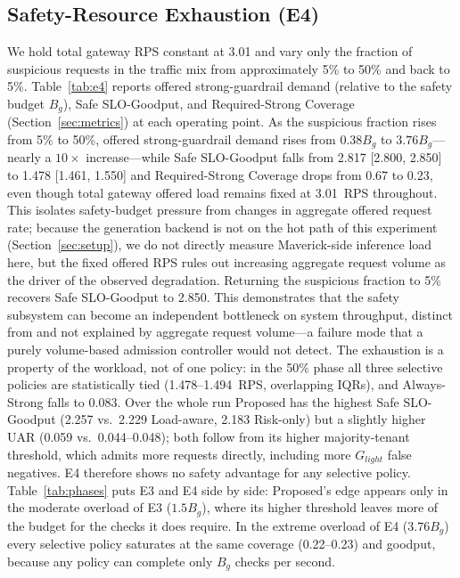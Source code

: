 \documentclass[conference]{IEEEtran}
\newcommand{\Glight}{G_{\mathit{light}}}
\newcommand{\Bg}{B_g}
\begin{document}
\subsection{Safety-Resource Exhaustion (E4)}

We hold total gateway RPS constant at 3.01 and vary only the fraction of suspicious requests in the traffic mix from approximately 5\% to 50\% and back to 5\%. Table~\ref{tab:e4} reports offered strong-guardrail demand (relative to the safety budget $\Bg$), Safe SLO-Goodput, and Required-Strong Coverage (Section~\ref{sec:metrics}) at each operating point. As the suspicious fraction rises from 5\% to 50\%, offered strong-guardrail demand rises from $0.38\Bg$ to $3.76\Bg$---nearly a $10\times$ increase---while Safe SLO-Goodput falls from 2.817 [2.800, 2.850] to 1.478 [1.461, 1.550] and Required-Strong Coverage drops from 0.67 to 0.23, even though total gateway offered load remains fixed at 3.01~RPS throughout. This isolates safety-budget pressure from changes in aggregate offered request rate; because the generation backend is not on the hot path of this experiment (Section~\ref{sec:setup}), we do not directly measure Maverick-side inference load here, but the fixed offered RPS rules out increasing aggregate request volume as the driver of the observed degradation. Returning the suspicious fraction to 5\% recovers Safe SLO-Goodput to 2.850. This demonstrates that the safety subsystem can become an independent bottleneck on system throughput, distinct from and not explained by aggregate request volume---a failure mode that a purely volume-based admission controller would not detect. The exhaustion is a property of the workload, not of one policy: in the 50\% phase all three selective policies are statistically tied (1.478--1.494~RPS, overlapping IQRs), and Always-Strong falls to 0.083. Over the whole run Proposed has the highest Safe SLO-Goodput (2.257 vs.\ 2.229 Load-aware, 2.183 Risk-only) but a slightly higher UAR (0.059 vs.\ 0.044--0.048); both follow from its higher majority-tenant threshold, which admits more requests directly, including more $\Glight$ false negatives. E4 therefore shows no safety advantage for any selective policy. Table~\ref{tab:phases} puts E3 and E4 side by side: Proposed's edge appears only in the moderate overload of E3 ($1.5\Bg$), where its higher threshold leaves more of the budget for the checks it does require. In the extreme overload of E4 ($3.76\Bg$) every selective policy saturates at the same coverage (0.22--0.23) and goodput, because any policy can complete only $\Bg$ checks per second.
\end{document}
